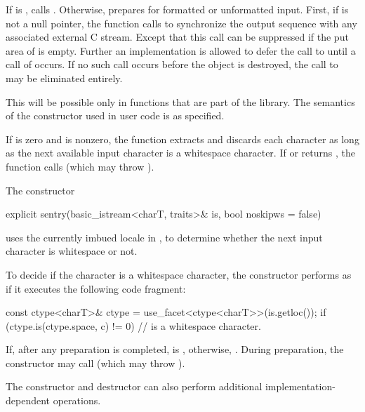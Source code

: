 \begin{itemdescr}
\pnum
\effects
If
is
,
calls . Otherwise,
prepares for formatted or
unformatted input.
First, if
is not a null pointer, the
function calls
%
to synchronize the output sequence with any associated external
C stream.
Except that this call can be suppressed if the put area of
is empty.
Further an implementation is allowed to defer the call to
until a
call of
occurs.
If no such call occurs before the
object is destroyed, the call to
may be eliminated entirely.
\begin{footnote}
This will be possible only in functions
that are part of the library.
The semantics of the constructor used in user code is as specified.
\end{footnote}
If  is zero and
is nonzero, the function extracts and discards each character as long as
the next available input character  is a whitespace character.
If
or
returns
,
the function calls
(which may throw
).

\pnum
\remarks
The constructor
\begin{codeblock}
explicit sentry(basic_istream<charT, traits>& is, bool noskipws = false)
\end{codeblock}
uses the currently imbued locale in ,
to determine whether the next input character is
whitespace or not.

\pnum
To decide if the character  is a whitespace character,
the constructor performs as if it executes the following code fragment:
\begin{codeblock}
const ctype<charT>& ctype = use_facet<ctype<charT>>(is.getloc());
if (ctype.is(ctype.space, c) != 0)
  //  is a whitespace character.
\end{codeblock}

\pnum
If, after any preparation is completed,
is
,
otherwise,
.
During preparation, the constructor may call
(which may throw
).
\begin{footnote}
The
constructor and destructor
can also perform additional
%
implementation-dependent operations.
\end{footnote}
\end{itemdescr}

